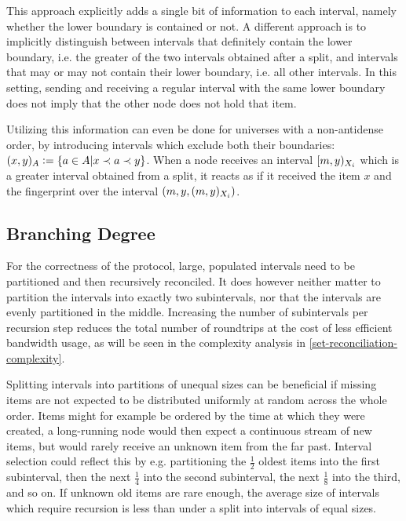 This approach explicitly adds a single bit of information to each interval, namely whether the lower boundary is contained or not. A different approach is to implicitly distinguish between intervals that definitely contain the lower boundary, i.e. the greater of the two intervals obtained after a split, and intervals that may or may not contain their lower boundary, i.e. all other intervals. In this setting, sending and receiving a regular interval with the same lower boundary does not imply that the other node does not hold that item.

Utilizing this information can even be done for universes with a non-antidense order, by introducing intervals which exclude both their boundaries: $({x},{y})_{A} \vcentcolon= \{a \in A | x \prec a \prec y\}$. When a node receives an interval $[{m},{y})_{X_i}$ which is a greater interval obtained from a split, it reacts as if it received the item $x$ and the fingerprint over the interval $({m}, {y}, {({m},{y})_{X_i}})$.

\subsection{Branching Degree}

For the correctness of the protocol, large, populated intervals need to be partitioned and then recursively reconciled. It does however neither matter to partition the intervals into exactly two subintervals, nor that the intervals are evenly partitioned in the middle. Increasing the number of subintervals per recursion step reduces the total number of roundtrips at the cost of less efficient bandwidth usage, as will be seen in the complexity analysis in \cref{set-reconciliation-complexity}.

Splitting intervals into partitions of unequal sizes can be beneficial if missing items are not expected to be distributed uniformly at random across the whole order. Items might for example be ordered by the time at which they were created, a long-running node would then expect a continuous stream of new items, but would rarely receive an unknown item from the far past. Interval selection could reflect this by e.g. partitioning the $\frac{1}{2}$ oldest items into the first subinterval, then the next $\frac{1}{4}$ into the second subinterval, the next $\frac{1}{8}$ into the third, and so on. If unknown old items are rare enough, the average size of intervals which require recursion is less than under a split into intervals of equal sizes.


